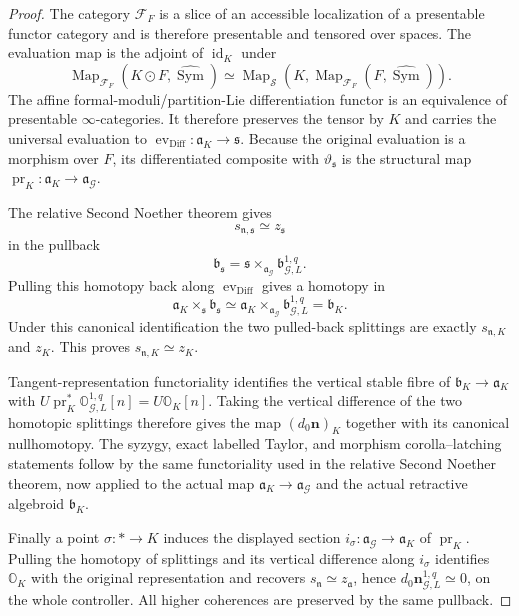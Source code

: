 \begin{proof}
The category $\mathcal F_F$ is a slice of an accessible localization of a
presentable functor category and is therefore presentable and tensored over
spaces.  The evaluation map is the adjoint of
$\operatorname{id}_{K}$ under
\[
\operatorname{Map}_{\mathcal F_F}
(K\odot F,\widehat{\operatorname{Sym}})
\simeq
\operatorname{Map}_{\mathcal S}
\left(
K,
\operatorname{Map}_{\mathcal F_F}(F,\widehat{\operatorname{Sym}})
\right).
\]
The affine formal-moduli/partition-Lie differentiation functor is an equivalence of
presentable $\infty$-categories.  It therefore preserves the tensor by $K$ and
carries the universal evaluation to
$\operatorname{ev}_{\mathrm{Diff}}:\mathfrak a_K\to\mathfrak s$.  Because the
original evaluation is a morphism over $F$, its differentiated composite with
$\vartheta_{\mathfrak s}$ is the structural map
$\operatorname{pr}_K:\mathfrak a_K\to\mathfrak a_{\mathcal G}$.

The relative Second Noether theorem gives
\[
s_{\mathfrak n,\mathfrak s}\simeq z_{\mathfrak s}
\]
in the pullback
\[
\mathfrak b_{\mathfrak s}
=
\mathfrak s\times_{\mathfrak a_{\mathcal G}}
\mathfrak b_{\mathcal G,L}^{1,q}.
\]
Pulling this homotopy back along
$\operatorname{ev}_{\mathrm{Diff}}$ gives a homotopy in
\[
\mathfrak a_K
\times_{\mathfrak s}
\mathfrak b_{\mathfrak s}
\simeq
\mathfrak a_K
\times_{\mathfrak a_{\mathcal G}}
\mathfrak b_{\mathcal G,L}^{1,q}
=
\mathfrak b_K.
\]
Under this canonical identification the two pulled-back splittings are exactly
$s_{\mathfrak n,K}$ and $z_K$.  This proves
$s_{\mathfrak n,K}\simeq z_K$.

Tangent-representation functoriality identifies the vertical stable fibre of
$\mathfrak b_K\to\mathfrak a_K$ with
$U\operatorname{pr}_K^*\mathbb O_{\mathcal G,L}^{1,q}[n]=U\mathbb O_K[n]$.
Taking the vertical difference of the two homotopic splittings therefore gives the
map $(d_0\mathbf n)_K$ together with its canonical nullhomotopy.  The syzygy,
exact labelled Taylor, and morphism corolla--latching statements follow by the
same functoriality used in the relative Second Noether theorem, now applied to the
actual map $\mathfrak a_K\to\mathfrak a_{\mathcal G}$ and the actual retractive
algebroid $\mathfrak b_K$.

Finally a point $\sigma:*\to K$ induces the displayed section
$i_\sigma:\mathfrak a_{\mathcal G}\to\mathfrak a_K$ of $\operatorname{pr}_K$.
Pulling the homotopy of splittings and its vertical difference along $i_\sigma$
identifies $\mathbb O_K$ with the original representation and recovers
$s_{\mathfrak n}\simeq z_{\mathfrak a}$, hence
$d_0\mathbf n_{\mathcal G,L}^{1,q}\simeq0$, on the whole controller.  All higher
coherences are preserved by the same pullback.
\end{proof}

